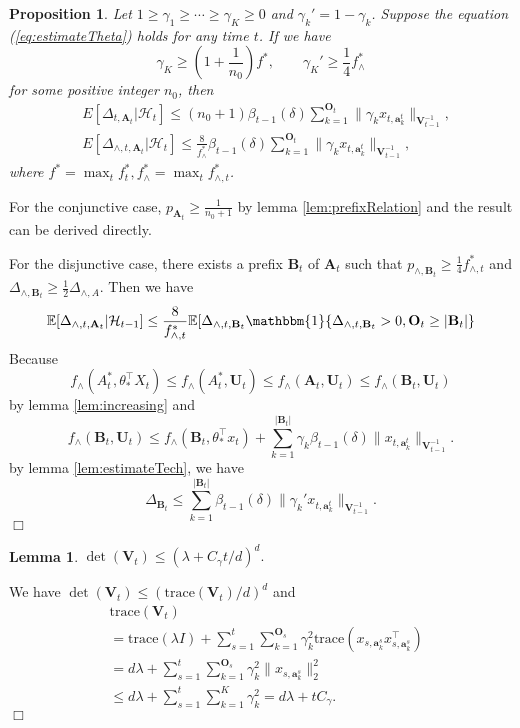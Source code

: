 \documentclass{article}
\newcommand{\EE}{\mathbb{E}}
\newcommand{\bOne}{\mathbbm{1}}
\newcommand{\bA}{\mathbf{A}}
\newcommand{\ba}{\mathbf{a}}
\newcommand{\bB}{\mathbf{B}}
\newcommand{\bO}{\mathbf{O}}
\newcommand{\bU}{\mathbf{U}}
\newcommand{\bV}{\mathbf{V}}
\newcommand{\cH}{\mathcal{H}}
\newcommand{\trace}{\mathrm{trace}}
\newcommand{\abs}[1]{\left| #1 \right|}
\newcommand{\norm}[1]{\| #1 \|}
\newtheorem{proposition}[theorem]{Proposition}%
\newtheorem{lemma}[theorem]{Lemma}%
\newenvironment{proof}{\noindent {\textbf{Proof. }}}{$\Box$ \medskip}
\begin{document}
\begin{proposition}
Let $1 \geq \gamma_1 \geq \cdots \geq \gamma_K \geq 0$ and $\gamma_k' = 1 - \gamma_k$. Suppose the equation (\ref{eq:estimateTheta}) holds for any time $t$. If we have
$$
\gamma_K \geq (1+\frac{1}{n_0})f^{\ast}, \qquad \gamma_K' \geq \frac{1}{4} f_{\wedge}^{\ast}
$$
for some positive integer $n_0$, then
\begin{align*}
&E[\Delta_{t, \bA_t}|\cH_t] \leq (n_0+1) \beta_{t-1}(\delta)\sum_{k=1}^{\bO_t}\norm{\gamma_k x_{t,\ba_k^t}}_{\bV_{t-1}^{-1}},\\
&E[\Delta_{\wedge, t, \bA_t}|\cH_t] \leq \frac{8}{f_{\wedge}^{\ast}} \beta_{t-1}(\delta)\sum_{k=1}^{\bO_t}\norm{\gamma_k x_{t,\ba_k^t}}_{\bV_{t-1}^{-1}},
\end{align*}
where $f^{\ast} = \max_{t} f_t^{\ast}, f_{\wedge}^{\ast} = \max_{t} f_{\wedge, t}^{\ast}$.
\end{proposition}
\begin{proof}
For the conjunctive case, $p_{\bA_t} \geq \frac{1}{n_0 + 1}$ by lemma \ref{lem:prefixRelation} and the result can be derived directly. 

For the disjunctive case, there exists a prefix $\bB_t$ of $\bA_t$ such that $p_{\wedge, \bB_t} \geq \frac{1}{4}f_{\wedge, t}^*$ and $\Delta_{\wedge, \bB_t} \geq \frac{1}{2}\Delta_{\wedge, A}$. Then we have
$$
\EE[\Delta_{\wedge, t, \bA_t} | \cH_{t-1}] \leq \frac{8}{f_{\wedge, t}^*} \EE[\Delta_{\wedge, t, \bB_t} \bOne\{\Delta_{\wedge, t, \bB_t} > 0, \bO_t \geq \abs{\bB_t}\}
$$
Because 
$$
f_{\wedge}(A_t^*, \theta_*^{\top}X_t) \leq f_{\wedge}(A_t^*,\bU_t) \leq f_{\wedge}(\bA_t,\bU_t) \leq f_{\wedge}(\bB_t,\bU_t)
$$
by lemma \ref{lem:increasing} and
$$
f_{\wedge}(\bB_t,\bU_t) \leq f_{\wedge}(\bB_t, \theta_*^{\top}x_t) + \sum_{k=1}^{\abs{\bB_t}}\gamma_k\beta_{t-1}(\delta)\norm{x_{t,\ba_k^t}}_{\bV_{t-1}^{-1}}.
$$
by lemma \ref{lem:estimateTech}, we have
$$
\Delta_{\bB_t} \leq \sum_{k=1}^{\abs{\bB_t}}\beta_{t-1}(\delta)\norm{\gamma_k' x_{t,\ba_k^t}}_{\bV_{t-1}^{-1}}.
$$
\end{proof}
	
\begin{lemma} %
$\det(\bV_t) \leq (\lambda + C_\gamma t/d)^d.$
\end{lemma}
\begin{proof}
We have $\det(\bV_t) \leq (\trace(\bV_t)/d)^d$ and
\begin{align*}
&\trace(\bV_t)\\
& = \trace(\lambda I) + \sum_{s=1}^t \sum_{k=1}^{\bO_s} \gamma_k^2 \trace(x_{s,\ba_k^s} x_{s,\ba_k^s}^{\top})\\	
& = d \lambda + \sum_{s=1}^t \sum_{k=1}^{\bO_s} \gamma_k^2 \norm{x_{s,\ba_k^s}}_2^2\\
& \leq d \lambda + \sum_{s=1}^t\sum_{k=1}^{K}\gamma_k^2 = d \lambda + t C_\gamma.
\end{align*}
\end{proof}
\end{document}
